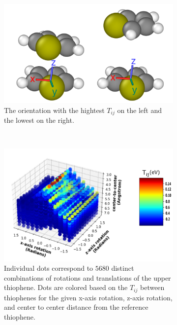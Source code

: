 \begin{figure}[]
\centering
\begin{subfigure}{.5\textwidth}
    \centering
    \includegraphics[width=\textwidth]{figures/thiophene-oreintations.png}
    \caption{The orientation with the hightest $T_{ij}$ on the left and
    the lowest on the right.}
\end{subfigure}%
\\
\begin{subfigure}{.9\textwidth}
    \centering
    \includegraphics[width=\textwidth]{figures/transfer_integral_plot.png}
    \caption{Individual dots correspond to $5680$ 
    distinct combinations of rotations and translations of the upper
    thiophene.
    Dots are colored based on the $T_{ij}$ between thiophenes for the given x-axis rotation,
    z-axis rotation, and center to
    center distance from the reference thiophene.}
\end{subfigure}
    \caption{ }
\label{TIplots}
\end{figure}

